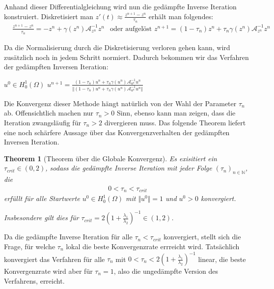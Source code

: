 \documentclass[final,bibliography=totocnumbered]{include/seminar}
\newcommand{\Honez}{\ensuremath{{H^1_0(\Omega)}}}
\newcommand{\mA}{\ensuremath{\mathcal{A}}}
\newcommand{\mAi}{\ensuremath{\mathcal{A}}^{-1}}
\theoremstyle{break}
\newtheorem{theorem}{Theorem}[section]
\begin{document}
Anhand dieser Differentialgleichung wird nun die gedämpfte Inverse Iteration
konstruiert.
Diskretisiert man $z'(t) \approx \frac{z^{n+1} - z^n}{\tau_n}$ erhält man folgendes:
\begin{align*}
    &\frac{z^{n+1} - z^n}{\tau_n} = -z^n + \gamma(z^n)\mAi_{z^n}z^n
    &\text{oder aufgelöst } z^{n+1} = (1 - \tau_n)z^n + \tau_n\gamma(z^n)\mAi_{z^n}z^n
\end{align*}

Da die Normalisierung durch die Diskretisierung verloren gehen kann, wird zusätzlich
noch in jedem Schritt normiert. Dadurch bekommen wir das Verfahren der
gedämpften Inversen Iteration:

\begin{algorithm}[H]
    \caption{Gedämpfte Inverse Iteration}
    \begin{algorithmic}[1]
        \STATE $u^0 \in \Honez$
        \STATE $u^{n+1} = \frac
        {(1-\tau_n)u^n + \tau_n\gamma(u^n)\mA_{u^n}^{-1} u^n}
        {\Vert(1-\tau_n)u^n + \tau_n\gamma(u^n)\mA_{u^n}^{-1} u^n\Vert}$
        \ENDFOR
    \end{algorithmic}
\end{algorithm}

Die Konvergenz dieser Methode hängt natürlich von der Wahl der Parameter
$\tau_n$ ab. Offensichtlich machen nur $\tau_n > 0$ Sinn, ebenso kann man zeigen,
dass die Iteration zwangsläufig für $\tau_n > 2$ divergieren muss.
Das folgende Theorem liefert eine noch schärfere Aussage über das Konvergenzverhalten
der gedämpften Inversen Iteration.

\begin{theorem}[Theorem über die Globale Konvergenz]
    Es exisitiert ein $\tau_{crit} \in (0,2)$, sodass die gedämpfte Inverse
    Iteration mit jeder Folge $(\tau_n)_{n \in \mathbb{N}}$, die
    \begin{align*}
        0 < \tau_n < \tau_{crit}
    \end{align*}
    erfüllt für alle Startwerte $u^0 \in \Honez$ mit $\Vert u^0 \Vert = 1$
    und $u^0 > 0$ konvergiert.

    Insbesondere gilt dies für $\tau_{crit} = 2(1 + \frac{\lambda_1}{\lambda_2})^{-1} \in (1, 2)$.
\end{theorem}

Da die gedämpfte Inverse Iteration für alle $\tau_n < \tau_{crit}$ konvergiert,
stellt sich die Frage, für welche $\tau_n$ lokal die beste Konvergenzrate
errreicht wird.
Tatsächlich konvergiert das Verfahren für alle $\tau_n$ mit $0 < \tau_n < 2(1 + \frac{\lambda_1}{\lambda_2})^{-1} $ linear,
die beste Konvergenzrate wird aber für $\tau_n = 1$, also die ungedämpfte Version
des Verfahrens, erreicht.
\end{document}
